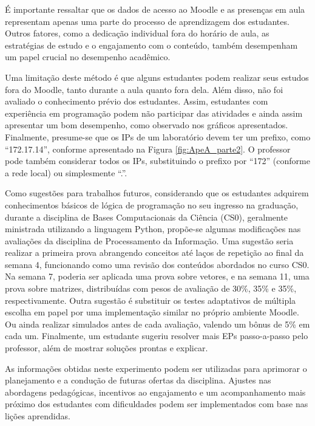 É importante ressaltar que os dados de acesso ao Moodle e as presenças em aula representam apenas uma parte do processo de aprendizagem dos estudantes. Outros fatores, como a dedicação individual fora do horário de aula, as estratégias de estudo e o engajamento com o conteúdo, também desempenham um papel crucial no desempenho acadêmico.

Uma limitação deste método é que alguns estudantes podem realizar seus estudos fora do Moodle, tanto durante a aula quanto fora dela. Além disso, não foi avaliado o conhecimento prévio dos estudantes. Assim, estudantes com experiência em programação podem não participar das atividades e ainda assim apresentar um bom desempenho, como observado nos gráficos apresentados. Finalmente, presume-se que os IPs de um laboratório devem ter um prefixo, como ``172.17.14'', conforme apresentado na Figura \ref{fig:ApeA_parte2}. O professor pode também considerar todos os IPs, substituindo o prefixo por ``172'' (conforme a rede local) ou simplesmente ``.''.

Como sugestões para trabalhos futuros, considerando que os estudantes adquirem conhecimentos básicos de lógica de programação no seu ingresso na graduação, durante a disciplina de Bases Computacionais da Ciência (CS0), geralmente ministrada utilizando a linguagem Python, propõe-se algumas modificações nas avaliações da disciplina de Processamento da Informação. Uma sugestão seria realizar a primeira prova abrangendo conceitos até laços de repetição ao final da semana 4, funcionando como uma revisão dos conteúdos abordados no curso CS0. Na semana 7, poderia ser aplicada uma prova sobre vetores, e na semana 11, uma prova sobre matrizes, distribuídas com pesos de avaliação de 30\%, 35\% e 35\%, respectivamente. Outra sugestão é substituir os testes adaptativos de múltipla escolha em papel por uma implementação similar no próprio ambiente Moodle. Ou ainda realizar simulados antes de cada avaliação, valendo um bônus de 5\% em cada um. Finalmente, um estudante sugeriu resolver mais EPs passo-a-passo pelo professor, além de mostrar soluções prontas e explicar.

As informações obtidas neste experimento podem ser utilizadas para aprimorar o planejamento e a condução de futuras ofertas da disciplina. Ajustes nas abordagens pedagógicas, incentivos ao engajamento e um acompanhamento mais próximo dos estudantes com dificuldades podem ser implementados com base nas lições aprendidas.
